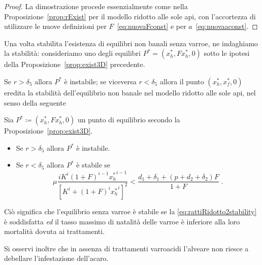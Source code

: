 \begin{proof}
La dimostrazione procede essenzialmente come nella Proposizione~\ref{prop:rExist} per il modello ridotto alle sole api,
con l'accortezza di utilizzare le nuove definizioni per $F$~\eqref{eq:nuovaFconst} e per $a$~\eqref{eq:nuovaaconst}.
\end{proof}

Una volta stabilita l'esistenza di equilibri non banali senza varroe, ne indaghiamo la stabilità:
consideriamo uno degli equilibri $P^* =(x_h^*, F x_h^*, 0)$ sotto le ipotesi della
Proposizione~\ref{prop:exist3D} precedente.

Se $r > \delta_5$ allora $P^*$ è instabile; se viceversa $r< \delta_5$ allora
il punto $(x_h^*, x_f^*, 0)$ eredita la stabilità dell'equilibrio non banale nel modello
ridotto alle sole api, nel senso della seguente

\begin{proposizione}
    Sia
    $P^* \coloneq (x_h^*, F x_h^*, 0)$ un punto di equilibrio secondo la Proposizione~\ref{prop:exist3D}.
    \begin{itemize}
        \item Se $r > \delta_5 $ allora $P^*$ è instabile.
        \item Se $r < \delta_5 $ allora $P^*$ è stabile se
        \begin{equation}
            \mu \frac{ i K^i (1+F)^{i-1}{x_h^*}^{i-1} }{ {\left[ K^i +(1+F)^i {x_h^*}^i \right]}^2 }
            < \frac{d_1 + \delta_1 + (p+d_2+\delta_2)F}{1+F} \; .
            \label{eq:rattiRidotto2stability}
        \end{equation}
    \end{itemize}
\end{proposizione}

Ciò significa che l'equilibrio senza varroe è stabile se la \eqref{eq:rattiRidotto2stability} è soddisfatta
\emph{ed} il tasso massimo di natalità delle varroe è inferiore alla loro mortalità dovuta ai trattamenti.

Si osservi inoltre che in assenza di trattamenti varroacidi l'alveare non riesce a debellare l'infestazione dell'acaro.

